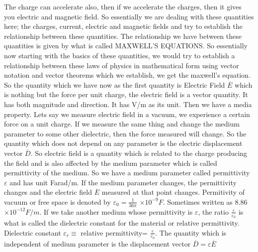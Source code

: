 The charge can accelerate also, then if we accelerate the charges, then it gives you electric and magnetic field. So essentially we are dealing with these quantities here; the charges, current, electric and magnetic fields and try to establish the relationship between these quantities. The relationship we have between these quantities is given by what is called MAXWELL'S EQUATIONS. So essentially now starting with the basics of these quantities, we would try to establish a relationship between these laws of physics in mathematical form using vector notation and vector theorems which we establish, we get the maxwell's equation. So the quantity which we have now as the first quantity is Electric Field $\overline{E}$ which is nothing but the force per unit charge, the electric field is a vector quantity. It has both magnitude and direction. It has V/m as its unit. Then we have a media property. Lets say we measure electric field in a vacuum, we experience a certain force on a unit charge. If we measure the same thing and change the medium parameter to some other dielectric, then the force measured will change. So the quantity which does not depend on any parameter is the electric displacement vector $\overline{D}$.
So electric field is a quantity which is related to the charge producing the field and is also affected by the medium parameter which is called permittivity of the medium. So we have a medium parameter called permittivity $\varepsilon$ and has unit Farad/m. If the medium parameter changes, the permittivity changes and the electric field $\overline{E}$ measured at that point changes. Permitivity of vacuum or free space is denoted by $\varepsilon_{0} =\frac{1}{36\pi}$ $\times 10^{-9}F$. Sometimes written as 8.86$\times10^{-12}F/m.$
If we take another medium whose permittivity is $\varepsilon$, the ratio $\frac{\varepsilon}{\varepsilon_{0}}$ is what is called the dielectric constant for the material or relative permittivity. 
Dielectric constant $\varepsilon_{r}\equiv$ relative permittivity= $\frac{\varepsilon}{\varepsilon_{0}}$.
The quantity which is independent of medium parameter is the displacement vector $\overline{D}=\varepsilon \overline{E}$

